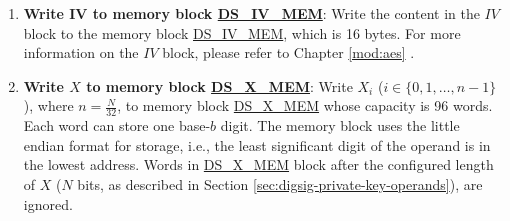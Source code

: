 \documentclass[main\_\_EN.tex]{subfiles}
\begin{document}
\begin{enumerate}
    \begin{itemize}

        \item If the software reads 0 in \hyperref[regdesc:DSQUERYKEYWRONGREG]{DS\_QUERY\_KEY\_WRONG\_REG}, it indicates that the HMAC peripheral has not been called.

        \item If the software reads any value from 1 to 15 in \hyperref[regdesc:DSQUERYKEYWRONGREG]{DS\_QUERY\_KEY\_WRONG\_REG}, it indicates that HMAC was called, but the RSA\_DS peripheral did not successfully get the \begin{math}RSA\_DS\_KEY\end{math} value from the HMAC peripheral. This may indicate that the HMAC operation has been interrupted due to a software concurrency problem.

    \end{itemize}

    \item {\bfseries Write IV to memory block \hyperref[DSIVMEM]{DS\_IV\_MEM}}: Write the content in the \begin{math}IV\end{math} block to the memory block \hyperref[DSIVMEM]{DS\_IV\_MEM}, which is 16 bytes. For more information on the \begin{math}IV\end{math} block, please refer to Chapter \ref{mod:aes} \textit{}.

    \item {\bfseries Write \begin{math}X\end{math} to memory block \hyperref[DSXMEM]{DS\_X\_MEM}}: Write \begin{math}X_{i}\end{math}
        (\begin{math}i \in \{ 0, 1, \dots, n-1 \} \end{math}), where \begin{math} n = \frac{N}{32} \end{math}, to memory block \hyperref[DSXMEM]{DS\_X\_MEM} whose capacity is 96 words. Each word can store one base-\begin{math}b\end{math} digit. The memory block uses the little endian format for storage, i.e., the least significant digit of the operand is in the lowest address. Words in \hyperref[DSXMEM]{DS\_X\_MEM} block after the configured length of \begin{math}X\end{math} (\begin{math}N\end{math} bits, as described in Section \ref{sec:digsig-private-key-operands}), are ignored.


\end{enumerate}
\end{document}
